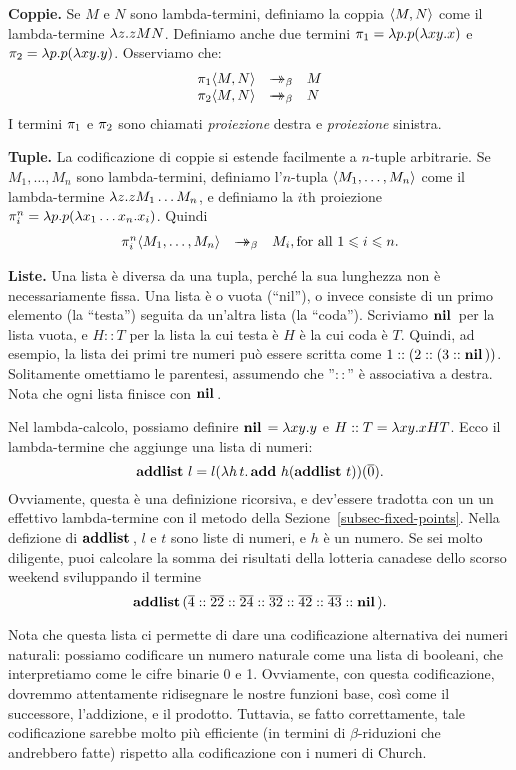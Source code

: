 \documentclass{article}
\begin{document}
{\bf Coppie.} Se $M$ e $N$ sono lambda-termini, definiamo la coppia
$\langle M,N\rangle$ come il lambda-termine $\lambda z.zMN$. Definiamo anche due
termini $\pi_1=\lambda p.p(\lambda xy.x)$ e $\pi_2=\lambda p.p(\lambda xy.y)$.
Osserviamo che:
\[  \begin{array}{rcl}
  \leftt \pair{M,N} &\redbs& M \\
  \rightt \pair{M,N} &\redbs& N
\end{array}
\]
I termini $\pi_1$ e $\pi_2$ sono chiamati {\em proiezione} destra e
{\em proiezione} sinistra.

{\bf Tuple.} La codificazione di coppie si estende facilmente a $n$-tuple
arbitrarie. Se $M_1,\ldots,M_n$ sono lambda-termini, definiamo l'$n$-tupla
$\langle M_1,\ldots,M_n\rangle$ come il lambda-termine $\lambda z.zM_1\ldots M_n$,
e definiamo la $i$th proiezione $\pi^n_i=\lambda p.p(\lambda x_1\ldots
x_n.x_i)$. Quindi
\[ \begin{array}{rcl}
  \pi^n_i\langle M_1,\ldots,M_n\rangle &\mathrel{\rightarrow\!\!\!\!\!\rightarrow}_{\beta}& M_i, \mbox{for all $1\leqslant i\leqslant n$.}
\end{array}
\]

{\bf Liste.} Una lista \`e diversa da una tupla, perch\'e la sua lunghezza non \`e
necessariamente fissa. Una lista \`e o vuota (``nil''), o invece
consiste di un primo elemento (la ``testa'') seguita da un'altra lista
(la ``coda''). Scriviamo $\mathop{\textbf{\bf nil}\,}$ per la lista vuota, e $H::T$ per la
lista la cui testa \`e $H$ \`e la cui coda \`e $T$. Quindi, ad esempio,
la lista dei primi tre numeri pu\`o essere scritta come
$1::(2::(3::\mathop{\textbf{\bf nil}\,}))$. Solitamente omettiamo le parentesi, assumendo
che ''$::$'' \`e associativa a destra. Nota che ogni lista
finisce con $\mathop{\textbf{\bf nil}\,}$.

Nel lambda-calcolo, possiamo definire $\mathop{\textbf{\bf nil}\,}=\lambda xy.y$ e $H::T =
\lambda xy.xHT$. Ecco il lambda-termine che aggiunge una lista di numeri:
\[ \mathop{\textbf{\bf addlist}\,} l = l(\lambda h\,t.\mathop{\textbf{\bf add}\,} h(\mathop{\textbf{\bf addlist}\,} t))(\mathop{\overline{0}}).
\]
Ovviamente, questa \`e una definizione ricorsiva, e dev'essere tradotta
con un un effettivo lambda-termine con il metodo della Sezione~\ref{subsec-fixed-points}.
Nella defizione di $\mathop{\textbf{\bf addlist}\,}$, $l$ e $t$ sono liste di numeri,
e $h$ \`e un numero. Se sei molto diligente, puoi calcolare la somma dei
risultati della lotteria canadese dello scorso weekend sviluppando il termine
\[ \mathop{\textbf{\bf addlist}\,} (\mathop{\overline{4}}::\mathop{\overline{22}}::\mathop{\overline{24}}::\mathop{\overline{32}}::\mathop{\overline{42}}::\mathop{\overline{43}}::\mathop{\textbf{\bf nil}\,}).
\]

Nota che questa lista ci permette di dare una codificazione alternativa
dei numeri naturali: possiamo codificare un numero naturale come una lista
di booleani, che interpretiamo come le cifre binarie 0 e 1. Ovviamente,
con questa codificazione, dovremmo attentamente ridisegnare le nostre
funzioni base, cos\`i come il successore, l'addizione, e il prodotto. Tuttavia,
se fatto correttamente, tale codificazione sarebbe molto pi\`u efficiente (in
termini di $\beta$-riduzioni che andrebbero fatte) rispetto alla codificazione
con i numeri di Church.
\end{document}
